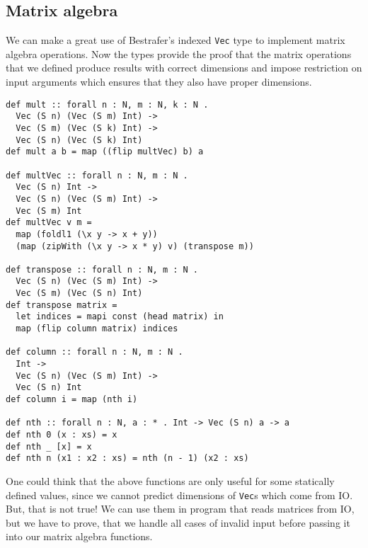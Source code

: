 \documentclass[declaration,shortabstract,english]{iithesis}
\begin{document}
\subsection*{Matrix algebra}
We can make a great use of Bestrafer's indexed \verb+Vec+ type to implement matrix algebra operations.
Now the types provide the proof that the matrix operations that we defined produce results with
correct dimensions and impose restriction on input arguments which ensures that they also have
proper dimensions.
\begin{verbatim}
def mult :: forall n : N, m : N, k : N .
  Vec (S n) (Vec (S m) Int) ->
  Vec (S m) (Vec (S k) Int) ->
  Vec (S n) (Vec (S k) Int)
def mult a b = map ((flip multVec) b) a

def multVec :: forall n : N, m : N .
  Vec (S n) Int ->
  Vec (S n) (Vec (S m) Int) ->
  Vec (S m) Int
def multVec v m =
  map (foldl1 (\x y -> x + y))
  (map (zipWith (\x y -> x * y) v) (transpose m))

def transpose :: forall n : N, m : N .
  Vec (S n) (Vec (S m) Int) ->
  Vec (S m) (Vec (S n) Int)
def transpose matrix =
  let indices = mapi const (head matrix) in
  map (flip column matrix) indices

def column :: forall n : N, m : N .
  Int ->
  Vec (S n) (Vec (S m) Int) ->
  Vec (S n) Int
def column i = map (nth i)

def nth :: forall n : N, a : * . Int -> Vec (S n) a -> a
def nth 0 (x : xs) = x
def nth _ [x] = x
def nth n (x1 : x2 : xs) = nth (n - 1) (x2 : xs)
\end{verbatim}
One could think that the above functions are only useful for some statically defined values,
since we cannot predict dimensions of \verb+Vec+s which come from IO. But, that is not true!
We can use them in program that reads matrices from IO, but we have to prove, that we handle
all cases of invalid input before passing it into our matrix algebra functions.
\end{document}
